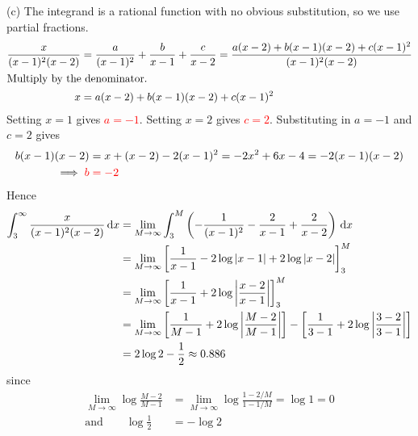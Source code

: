 \begin{solution}
\noindent (c)
The integrand is a rational function with no obvious substitution, so we use partial fractions.
\begin{align*}
\frac{x}{(x-1)^2(x-2)}
&=\frac{a}{(x-1)^2}+\frac{b}{x-1}+\frac{c}{x-2}
=\frac{a(x-2)+b(x-1)(x-2)+c(x-1)^2}{(x-1)^2(x-2)} \\
\intertext{Multiply by the denominator.}
x&=a(x-2)+b(x-1)(x-2)+c(x-1)^2
\end{align*}
Setting $x=1$ gives \textcolor{red}{$a=-1$}. Setting $x=2$ gives \textcolor{red}{$c=2$}. Substituting in $a=-1$
and $c=2$ gives
\begin{align*}
b(x-1)(x-2)&=x+(x-2)-2(x-1)^2=-2x^2+6x-4=-2(x-1)(x-2) \\
\implies \color{red}b&\color{red}=-2
\end{align*}
Hence
\begin{align*}
\int_3^\infty\frac{x}{(x-1)^2(x-2)}\,\mathrm{d}x
&=\lim_{M\rightarrow\infty}
\int_3^M\left(-\frac{1}{(x-1)^2}-\frac{2}{x-1}+\frac{2}{x-2}\right)\,\mathrm{d}x \\
&=\lim_{M\rightarrow\infty}
\left[\frac{1}{x-1}-2\log|x-1|+2\log|x-2|\right]_3^M\\
&=\lim_{M\rightarrow\infty}
\bigg[\frac{1}{x-1}+2\log\bigg|\frac{x-2}{x-1}\bigg|\bigg]_3^M\\
&=\lim_{M\rightarrow\infty}
\bigg[\frac{1}{M-1}+2\log\bigg|\frac{M-2}{M-1}\bigg|\bigg]
-\bigg[\frac{1}{3-1}+2\log\bigg|\frac{3-2}{3-1}\bigg|\bigg] \\
&=2\log 2-\frac{1}{2}\approx0.886
\end{align*}
since
\begin{align*}
\lim_{M\rightarrow\infty}\log\frac{M-2}{M-1}
&=\lim_{M\rightarrow\infty}\log\frac{1-2/M}{1-1/M}
=\log 1=0\\
\text{and}\qquad \log\frac{1}{2}&=-\log2
\end{align*}

\end{solution}

